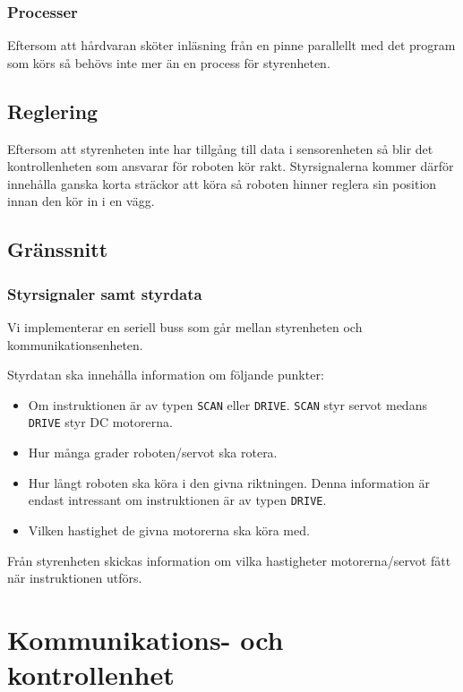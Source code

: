 \documentclass[a4paper,11pt]{article}
\begin{document}
\subsubsection{Processer}
Eftersom att hårdvaran sköter inläsning från en pinne parallellt med det program som körs så behövs inte mer än en process för styrenheten.

\subsection{Reglering}
Eftersom att styrenheten inte har tillgång till data i sensorenheten så blir det kontrollenheten som ansvarar för roboten kör rakt. Styrsignalerna kommer därför innehålla ganska korta sträckor att köra så roboten hinner reglera sin position innan den kör in i en vägg. 

\clearpage

\subsection{Gränssnitt} \label{ssec:controlInterface}

\subsubsection{Styrsignaler samt styrdata}
Vi implementerar en seriell buss som går mellan styrenheten och kommunikationsenheten.

Styrdatan ska innehålla information om följande punkter:
\begin{itemize}
	\item Om instruktionen är av typen \texttt{SCAN} eller \texttt{DRIVE}. \texttt{SCAN} styr servot medans \texttt{DRIVE} styr DC motorerna.
	\item Hur många grader roboten/servot ska rotera.
	\item Hur långt roboten ska köra i den givna riktningen. Denna information är endast intressant om instruktionen är av typen \texttt{DRIVE}.
	\item Vilken hastighet de givna motorerna ska köra med.
\end{itemize}

Från styrenheten skickas information om vilka hastigheter motorerna/servot fått när instruktionen utförs.

\clearpage
\section{Kommunikations- och kontrollenhet} \label{sec:system3}
\end{document}
